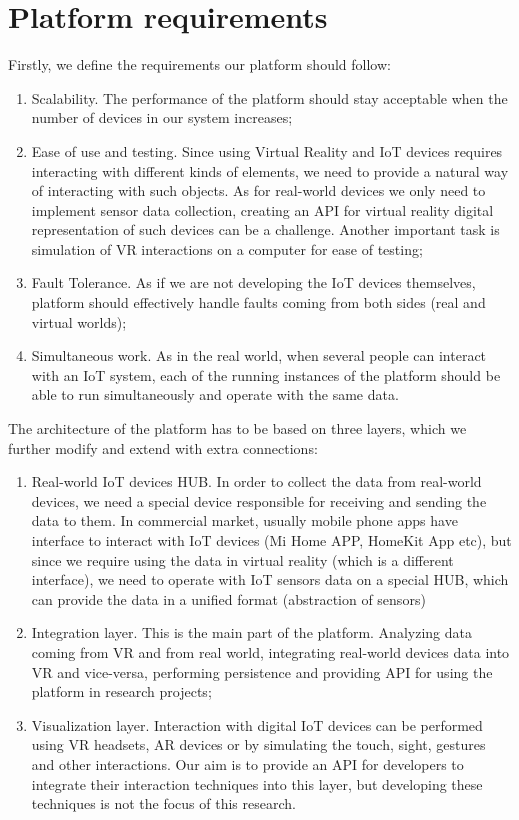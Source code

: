 \section{Platform requirements}
Firstly, we define the requirements our platform should follow:
\begin{enumerate}
\item Scalability. The performance of the platform should stay acceptable when the number of devices in our system increases;
\item Ease of use and testing. Since using Virtual Reality and IoT devices requires interacting with different kinds of elements, we need to provide a natural way of interacting with such objects. As for real-world devices we only need to implement sensor data collection, creating an API for virtual reality digital representation of such devices can be a challenge. Another important task is simulation of VR interactions on a computer for ease of testing;
\item Fault Tolerance. As if we are not developing the IoT devices themselves, platform should effectively handle faults coming from both sides (real and virtual worlds);
\item Simultaneous work. As in the real world, when several people can interact with an IoT system, each of the running instances of the platform should be able to run simultaneously and operate with the same data.
\end{enumerate}
The architecture of the platform has to be based on three layers, which we further modify and extend with extra connections: 
\begin{enumerate}
    \item Real-world IoT devices HUB. In order to collect the data from real-world devices, we need a special device responsible for receiving and sending the data to them. In commercial market, usually mobile phone apps have interface to interact with IoT devices (Mi Home APP, HomeKit App etc), but since we require using the data in virtual reality (which is a different interface), we need to operate with IoT sensors data on a special HUB, which can provide the data in a unified format (abstraction of sensors)
    \item Integration layer. This is the main part of the platform. Analyzing data coming from VR and from real world, integrating real-world devices data into VR and vice-versa, performing persistence and providing API for using the platform in research projects;
    \item Visualization layer. Interaction with digital IoT devices can be performed using VR headsets, AR devices or by simulating the touch, sight, gestures and other interactions. Our aim is to provide an API for developers to integrate their interaction techniques into this layer, but developing these techniques is not the focus of this research. 
\end{enumerate}

